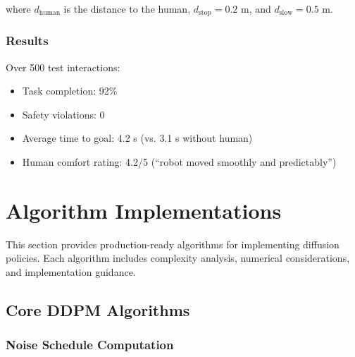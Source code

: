 where $d_{\text{human}}$ is the distance to the human, $d_{\text{stop}} = 0.2$ m, and $d_{\text{slow}} = 0.5$ m.

\subsubsection{Results}

Over 500 test interactions:
\begin{itemize}
    \item Task completion: 92\%
    \item Safety violations: 0
    \item Average time to goal: 4.2 s (vs. 3.1 s without human)
    \item Human comfort rating: 4.2/5 (``robot moved smoothly and predictably'')
\end{itemize}

\section{Algorithm Implementations}
\label{sec:algorithm_implementations}

This section provides production-ready algorithms for implementing diffusion policies. Each algorithm includes complexity analysis, numerical considerations, and implementation guidance.

\subsection{Core DDPM Algorithms}
\label{subsec:ddpm_algorithms}

\subsubsection{Noise Schedule Computation}


